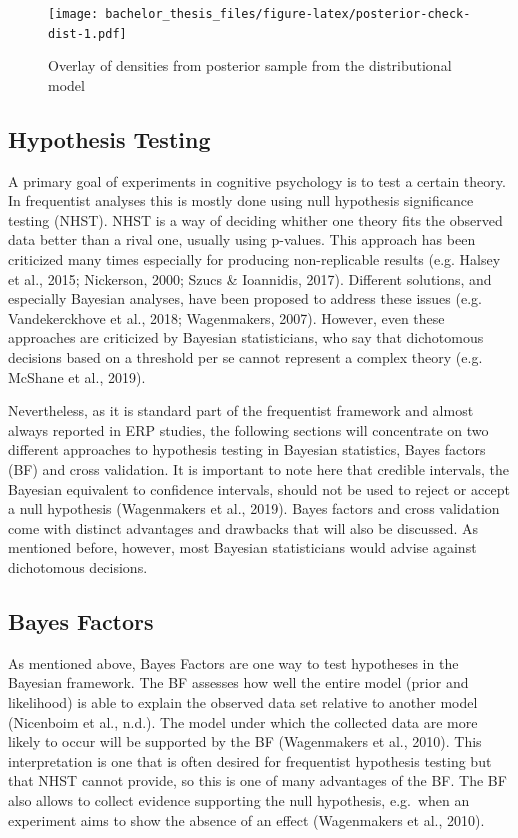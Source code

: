 \documentclass[
  doc,12pt,floatsintext]{apa7}
\begin{document}
\begin{figure}
\centering
\texttt{[image: bachelor\_thesis\_files/figure-latex/posterior-check-dist-1.pdf]}
\caption{\label{fig:posterior-check-dist}Overlay of densities from posterior sample from the distributional model}
\end{figure}

\subsection{Hypothesis Testing}\label{hypothesis-testing}

A primary goal of experiments in cognitive psychology is to test a certain theory. In frequentist analyses this is mostly done using null hypothesis significance testing (NHST). NHST is a way of deciding whither one theory fits the observed data better than a rival one, usually using p-values. This approach has been criticized many times especially for producing non-replicable results (e.g. Halsey et al., 2015; Nickerson, 2000; Szucs \& Ioannidis, 2017). Different solutions, and especially Bayesian analyses, have been proposed to address these issues (e.g. Vandekerckhove et al., 2018; Wagenmakers, 2007). However, even these approaches are criticized by Bayesian statisticians, who say that dichotomous decisions based on a threshold per se cannot represent a complex theory (e.g. McShane et al., 2019).

Nevertheless, as it is standard part of the frequentist framework and almost always reported in ERP studies, the following sections will concentrate on two different approaches to hypothesis testing in Bayesian statistics, Bayes factors (BF) and cross validation. It is important to note here that credible intervals, the Bayesian equivalent to confidence intervals, should not be used to reject or accept a null hypothesis (Wagenmakers et al., 2019). Bayes factors and cross validation come with distinct advantages and drawbacks that will also be discussed. As mentioned before, however, most Bayesian statisticians would advise against dichotomous decisions.

\subsection{Bayes Factors}\label{bayes-factors}

As mentioned above, Bayes Factors are one way to test hypotheses in the Bayesian framework. The BF assesses how well the entire model (prior and likelihood) is able to explain the observed data set relative to another model (Nicenboim et al., n.d.). The model under which the collected data are more likely to occur will be supported by the BF (Wagenmakers et al., 2010). This interpretation is one that is often desired for frequentist hypothesis testing but that NHST cannot provide, so this is one of many advantages of the BF. The BF also allows to collect evidence supporting the null hypothesis, e.g.~when an experiment aims to show the absence of an effect (Wagenmakers et al., 2010).
\end{document}
